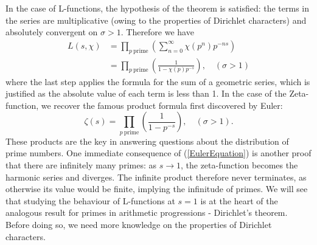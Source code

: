 In the case of L-functions, the hypothesis of the theorem is satisfied: the terms in the series are multiplicative (owing to the properties of Dirichlet characters) and absolutely convergent on $\sigma > 1$. Therefore we have
\begin{align}
    L(s, \chi) &= \prod_{p \ \mathrm{prime}} \left(\sum_{n=0}^{\infty} \chi(p^{n})p^{-ns} \right) \nonumber \\
    &= \prod_{p \ \mathrm{prime}} \left(\frac{1}{1 - \chi(p)p^{-s}} \right), \quad (\sigma > 1)
\end{align}
where the last step applies the formula for the sum of a geometric series, which is justified as the absolute value of each term is less than 1. In the case of the Zeta-function, we recover the famous product formula first discovered by Euler:
\begin{equation}
    \label{EulerEquation}
    \zeta(s) = \prod_{p \ \mathrm{prime}} \left(\frac{1}{1 - p^{-s}} \right), \quad (\sigma > 1). 
\end{equation}
These products are the key in answering questions about the distribution of prime numbers. One immediate consequence of (\ref{EulerEquation}) is another proof that there are infinitely many primes: as $s \rightarrow 1$, the zeta-function becomes the harmonic series and diverges. The infinite product therefore never terminates, as otherwise its value would be finite, implying the infinitude of primes. We will see that studying the behaviour of L-functions at $s=1$ is at the heart of the analogous result for primes in arithmetic progressions - Dirichlet's theorem. Before doing so, we need more knowledge on the properties of Dirichlet characters.\\